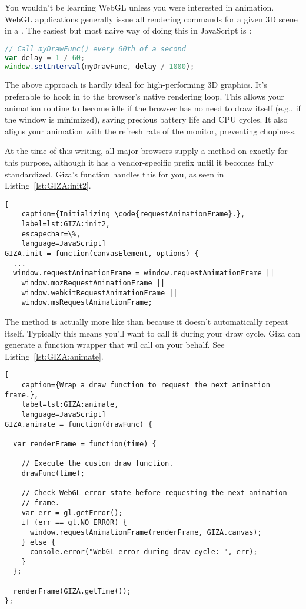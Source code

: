 You wouldn't be learning WebGL unless you were interested in animation.  WebGL applications generally issue all rendering commands for a given 3D scene in a .  The easiest but most naive way of doing this in JavaScript is :

\begin{lstlisting}[language=JavaScript]
// Call myDrawFunc() every 60th of a second
var delay = 1 / 60;
window.setInterval(myDrawFunc, delay / 1000);
\end{lstlisting}

The above approach is hardly ideal for high-performing 3D graphics.  It's preferable to hook in to the browser's native rendering loop.  This allows your animation routine to become idle if the browser has no need to draw itself (e.g., if the window is minimized), saving precious battery life and CPU cycles.  It also aligns your animation with the refresh rate of the monitor, preventing chopiness.

At the time of this writing, all major browsers supply a method on  exactly for this purpose, although it has a vendor-specific prefix until it becomes fully standardized.  Giza's  function handles this for you, as seen in Listing~\ref{lst:GIZA:init2}.

\begin{lstlisting}[
    caption={Initializing \code{requestAnimationFrame}.},
    label=lst:GIZA:init2,
    escapechar=\%,
    language=JavaScript]
GIZA.init = function(canvasElement, options) {
  ...
  window.requestAnimationFrame = window.requestAnimationFrame ||
    window.mozRequestAnimationFrame ||
    window.webkitRequestAnimationFrame ||
    window.msRequestAnimationFrame;
\end{lstlisting} 

The  method is actually more like  than  because it doesn't automatically repeat itself.  Typically this means you'll want to call it during your draw cycle.  Giza can generate a function wrapper that wil call  on your behalf.  See Listing~\ref{lst:GIZA:animate}.

\begin{lstlisting}[
    caption={Wrap a draw function to request the next animation frame.},
    label=lst:GIZA:animate,
    language=JavaScript]
GIZA.animate = function(drawFunc) {

  var renderFrame = function(time) {

    // Execute the custom draw function.
    drawFunc(time);

    // Check WebGL error state before requesting the next animation
    // frame.
    var err = gl.getError();
    if (err == gl.NO_ERROR) {
      window.requestAnimationFrame(renderFrame, GIZA.canvas);
    } else {
      console.error("WebGL error during draw cycle: ", err);
    }
  };

  renderFrame(GIZA.getTime());
};
\end{lstlisting} 

